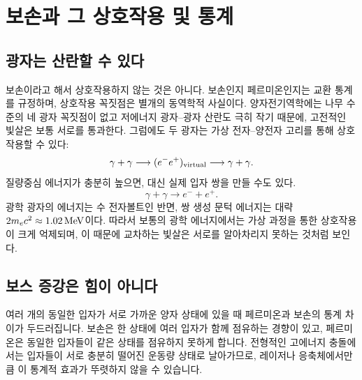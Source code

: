 \section{보손과 그 상호작용 및 통계}

\subsection{광자는 산란할 수 있다}

보손이라고 해서 상호작용하지 않는 것은 아니다. 보손인지 페르미온인지는 교환 통계를 규정하며, 상호작용 꼭짓점은 별개의 동역학적 사실이다. 양자전기역학에는 나무 수준의 네 광자 꼭짓점이 없고 저에너지 광자--광자 산란도 극히 작기 때문에, 고전적인 빛살은 보통 서로를 통과한다. 그럼에도 두 광자는 가상 전자--양전자 고리를 통해 상호작용할 수 있다:
\begin{equation}
  \gamma+\gamma
  \longrightarrow(e^-e^+)_{\rm virtual}
  \longrightarrow\gamma+\gamma.
\end{equation}
질량중심 에너지가 충분히 높으면, 대신 실제 입자 쌍을 만들 수도 있다.
\begin{equation}
  \gamma+\gamma\longrightarrow e^-+e^+.
\end{equation}
광학 광자의 에너지는 수 전자볼트인 반면, 쌍 생성 문턱 에너지는 대략 \(2m_e c^2\approx1.02\,{\rm MeV}\)이다. 따라서 보통의 광학 에너지에서는 가상 과정을 통한 상호작용이 크게 억제되며, 이 때문에 교차하는 빛살은 서로를 알아차리지 못하는 것처럼 보인다.

\begin{classroomqa}
\end{classroomqa}

\subsection{보스 증강은 힘이 아니다}

여러 개의 동일한 입자가 서로 가까운 양자 상태에 있을 때 페르미온과 보손의 통계 차이가 두드러집니다. 보손은 한 상태에 여러 입자가 함께 점유하는 경향이 있고, 페르미온은 동일한 입자들이 같은 상태를 점유하지 못하게 합니다. 전형적인 고에너지 충돌에서는 입자들이 서로 충분히 떨어진 운동량 상태로 날아가므로, 레이저나 응축체에서만큼 이 통계적 효과가 뚜렷하지 않을 수 있습니다.

